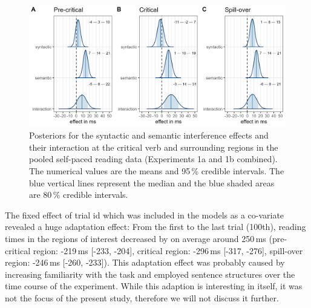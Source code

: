 \documentclass[review,preprint,12pt,authoryear,floatsintext]{elsarticle}
\begin{document}
\begin{figure}[ht]
    \caption{Posteriors for the syntactic and semantic interference effects and their interaction at the critical verb and surrounding regions in the pooled self-paced reading data (Experiments 1a and 1b combined). The numerical values are the means and 95\,\% credible intervals. The blue vertical lines represent the median and the blue shaded areas are 80\,\% credible intervals.}
    \label{fig:spr_posteriors}
    \centering
    \includegraphics[width=\textwidth]{posteriors_spr_pooled_774.png}
\end{figure}


The fixed effect of trial id which was included in the models as a co-variate revealed a huge adaptation effect: From the first to the last trial (100th), reading times in the regions of interest decreased by on average around 250\,ms (pre-critical region: -219\,ms [-233, -204], critical region: -296\,ms [-317, -276], spill-over region: -246\,ms [-260, -233]). This adaptation effect was probably caused by increasing familiarity with the task and employed sentence structures over the time course of the experiment. While this adaption is interesting in itself, it was not the focus of the present study, therefore we will not discuss it further.
\end{document}
